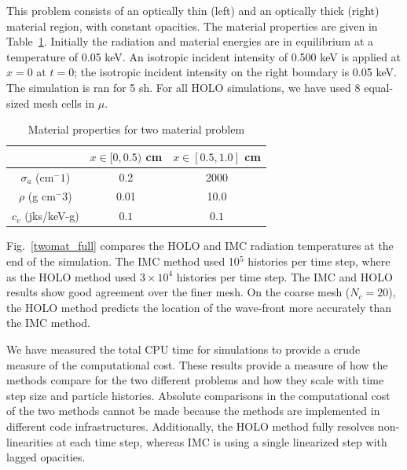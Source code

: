 \documentclass{mc2013}
\begin{document}
This problem consists of an optically thin (left) and an optically thick (right) material region,
with constant opacities.  The material properties are given in
Table~\ref{two_mat_props}.  Initially the radiation and material energies are in
equilibrium at a temperature of 0.05 keV.  An isotropic incident intensity of 0.500 keV
is applied at $x=0$ at $t=0$; the isotropic incident intensity on the right boundary is 0.05
keV.  The simulation is ran for 5 sh. For all HOLO simulations, we have used 8 equal-sized mesh cells in $\mu$.
\begin{table}[H]
        \caption{Material properties for two material problem\label{two_mat_props}}
\centering
        \begin{tabular}{|c|cc|}  \cline{2-3}
            \multicolumn{1}{c|}{}   & $x \in [0,0.5)$ cm & $x \in [0.5,1.0]$ cm   \\ \hline
            $\sigma_a$ (cm$^-1$)  & 0.2 & 2000 \\
            $\rho$ (g cm$^-3$) & 0.01 & 10.0 \\
            $c_v$ (jks/keV-g) & $0.1$ & $0.1$ \\ \hline
        \end{tabular}
\end{table}
Fig.~\ref{twomat_full} compares the HOLO and IMC radiation 
temperatures at the end of the simulation. The IMC method used 10$^5$ histories per
time step, where as the HOLO method used $3\times10^4$ histories per time step.  The
IMC and HOLO results show good agreement
over the finer mesh.
On the coarse mesh ($N_c=20$), the HOLO method predicts the location of the
wave-front more accurately than the IMC method. 



We have measured the total CPU time for simulations to provide a crude measure of the
computational cost.  These results provide a measure of how the methods compare for
the two different problems and how they scale with
time step size and particle histories.  Absolute comparisons in the computational cost of the two
methods cannot be made because the methods are implemented
in different code infrastructures. Additionally, the HOLO method fully resolves
non-linearities at each time step, whereas IMC is using a single linearized step with
lagged opacities. 
\end{document}
